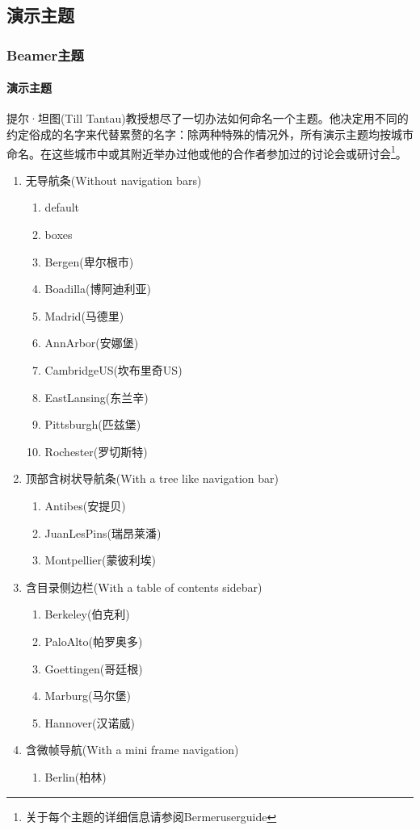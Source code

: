 \documentclass{beamer}
\begin{document}
\subsection{演示主题}
\begin{frame}[allowframebreaks]
\frametitle{Beamer主题}
\framesubtitle{演示主题}
提尔·坦图(Till Tantau)教授想尽了一切办法如何命名一个主题。他决定用不同的约定俗成的名字来代替累赘的名字：除两种特殊的情况外，所有演示主题均按城市命名。在这些城市中或其附近举办过他或他的合作者参加过的讨论会或研讨会\footnote{关于每个主题的详细信息请参阅Bermeruserguide}。
\begin{enumerate}[I]
\item 无导航条(Without navigation bars)
\begin{enumerate}
\item default 
\item boxes 
\item Bergen(卑尔根市)
\item Boadilla(博阿迪利亚)
\item Madrid(马德里)
\item AnnArbor(安娜堡)
\item CambridgeUS(坎布里奇US)
\item EastLansing(东兰辛)
\item Pittsburgh(匹兹堡)
\item Rochester(罗切斯特)
\end{enumerate}
\item 顶部含树状导航条(With a tree like navigation bar)
\begin{enumerate}
\item Antibes(安提贝)
\item JuanLesPins(瑞昂莱潘)
\item Montpellier(蒙彼利埃)
\end{enumerate}
\item 含目录侧边栏(With a table of contents sidebar)
\begin{enumerate}
\item Berkeley(伯克利)
\item PaloAlto(帕罗奥多)
\item Goettingen(哥廷根)
\item Marburg(马尔堡)
\item Hannover(汉诺威)
\end{enumerate}
\item 含微帧导航(With a mini frame navigation)
\begin{enumerate}
\item Berlin(柏林)

\end{enumerate}
\end{enumerate}
\end{frame}
\end{document}
